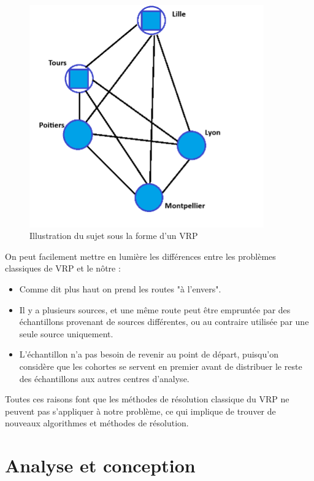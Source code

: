 \documentclass{polytech/polytech}
\numberwithin{figure}{chapter}
\begin{document}
\begin{figure}[h]
    \centering
    \includegraphics[width=0.9\textwidth]{pic/VRPPRD.png}
    \caption{Illustration du sujet sous la forme d'un VRP}
    \label{Illustration du sujet sous la forme d'un VRP}
\end{figure}

On peut facilement mettre en lumière les différences entre les problèmes classiques de VRP et le nôtre : 
\begin{itemize}
	\item Comme dit plus haut on prend les routes "à l'envers".
	\item Il y a plusieurs sources, et une même route peut être empruntée par des échantillons provenant de sources différentes, ou au contraire utilisée par une seule source uniquement.
	\item L'échantillon n'a pas besoin de revenir au point de départ, puisqu'on considère que les cohortes se servent en premier avant de distribuer le reste des échantillons aux autres centres d'analyse.
\end{itemize}

Toutes ces raisons font que les méthodes de résolution classique du VRP ne peuvent pas s'appliquer à notre problème, ce qui implique de trouver de nouveaux algorithmes et méthodes de résolution.


\chapter{Analyse et conception}
\end{document}
